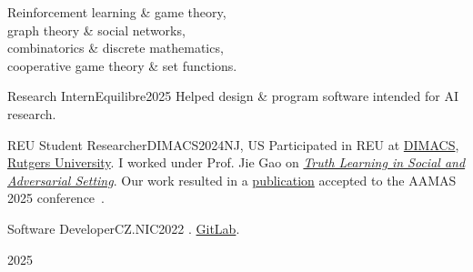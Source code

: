\begin{multicols}{2}
\raggedcolumns


Reinforcement learning \& game theory, \\
graph theory \& social networks, \\
combinatorics \& discrete mathematics, \\
cooperative game theory \& set functions.



\begin{work}{Research Intern}{Equilibre}{2025}{\Praha{}}
	{Helped design \& program software intended for AI research.}
\end{work}

\worksplit

\begin{work}{REU Student Researcher}{DIMACS}{2024}{NJ, US}
	{Participated in REU at} \href{http://dmac.rutgers.edu/}{DIMACS}, \href{https://www.rutgers.edu/}{Rutgers University}.
	{I worked under Prof. Jie Gao on} \emph{\href{https://reu.dimacs.rutgers.edu/~fu37/}{Truth Learning in Social and Adversarial Setting}}.
	{Our work resulted in a \href{https://furadnik.github.io/projects/2025_truth_learning}{publication} accepted to the AAMAS 2025 conference}~\cite{aamas25}.
\end{work}

\worksplit

\begin{work}{Software Developer}{CZ.NIC}{2022}{\Praha{}}
	.
	 \href{https://gitlab.nic.cz/fred/eppic}{GitLab}.
\end{work}

\columnbreak


{}{2025}


\end{multicols}
